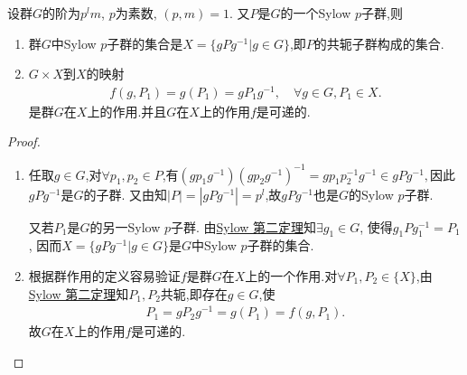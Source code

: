 \documentclass[../../main.tex]{subfiles}%
\begin{document}
\begin{corollary}\label{corollary:p群中的所有Sylow p子群}
设群$G$的阶为$p^lm$, $p$为素数, $(p,m)=1$. 又$P$是$G$的一个Sylow $p$子群,则
\begin{enumerate}[(1)]
\item\label{corollary:p群中的所有Sylow p子群-1} 群$G$中Sylow $p$子群的集合是$X=\{gPg^{-1}|g\in G\}$,即$P$的共轭子群构成的集合.

\item\label{corollary:p群中的所有Sylow p子群-2} $G\times X$到$X$的映射
\begin{align*}
f(g,P_1)=g(P_1)=gP_1g^{-1}, \quad \forall g\in G, P_1\in X.
\end{align*}
是群$G$在$X$上的作用.并且$G$在$X$上的作用$f$是可递的.
\end{enumerate}
\end{corollary}
\begin{proof}
\begin{enumerate}[(1)]
\item 任取$g\in G$,对$\forall p_1,p_2\in P$,有$(gp_1g^{-1})(gp_2g^{-1})^{-1}=gp_1p_2^{-1}g^{-1}\in gPg^{-1},$因此$gPg^{-1}$是$G$的子群.
又由知$|P|=|gPg^{-1}|=p^l$,故$gPg^{-1}$也是$G$的Sylow $p$子群.

又若$P_1$是$G$的另一Sylow $p$子群. 由\hyperref[theorem:Sylow 第二定理]{Sylow 第二定理}知$\exists g_1\in G$, 使得$g_1Pg_1^{-1}=P_1$, 因而$X=\{gPg^{-1}|g\in G\}$是$G$中Sylow $p$子群的集合.

\item 根据群作用的定义容易验证$f$是群$G$在$X$上的一个作用.对$\forall P_1,P_2\in \{X\}$,由\hyperref[theorem:Sylow 第二定理]{Sylow 第二定理}知$P_1,P_2$共轭,即存在$g\in G$,使
\begin{align*}
P_1=gP_2g^{-1}=g(P_1)=f(g,P_1).
\end{align*}
故$G$在$X$上的作用$f$是可递的.
\end{enumerate}

\end{proof}
\end{document}
